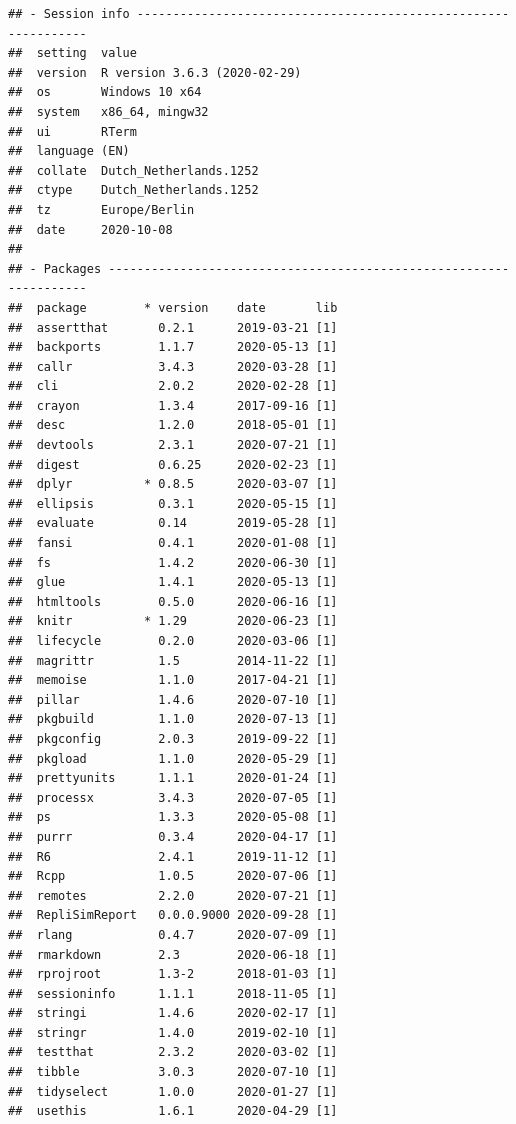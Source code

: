 \documentclass[10,a4paperpaper,]{article}
\begin{document}
\begin{verbatim}
## - Session info ---------------------------------------------------------------
##  setting  value                       
##  version  R version 3.6.3 (2020-02-29)
##  os       Windows 10 x64              
##  system   x86_64, mingw32             
##  ui       RTerm                       
##  language (EN)                        
##  collate  Dutch_Netherlands.1252      
##  ctype    Dutch_Netherlands.1252      
##  tz       Europe/Berlin               
##  date     2020-10-08                  
## 
## - Packages -------------------------------------------------------------------
##  package        * version    date       lib
##  assertthat       0.2.1      2019-03-21 [1]
##  backports        1.1.7      2020-05-13 [1]
##  callr            3.4.3      2020-03-28 [1]
##  cli              2.0.2      2020-02-28 [1]
##  crayon           1.3.4      2017-09-16 [1]
##  desc             1.2.0      2018-05-01 [1]
##  devtools         2.3.1      2020-07-21 [1]
##  digest           0.6.25     2020-02-23 [1]
##  dplyr          * 0.8.5      2020-03-07 [1]
##  ellipsis         0.3.1      2020-05-15 [1]
##  evaluate         0.14       2019-05-28 [1]
##  fansi            0.4.1      2020-01-08 [1]
##  fs               1.4.2      2020-06-30 [1]
##  glue             1.4.1      2020-05-13 [1]
##  htmltools        0.5.0      2020-06-16 [1]
##  knitr          * 1.29       2020-06-23 [1]
##  lifecycle        0.2.0      2020-03-06 [1]
##  magrittr         1.5        2014-11-22 [1]
##  memoise          1.1.0      2017-04-21 [1]
##  pillar           1.4.6      2020-07-10 [1]
##  pkgbuild         1.1.0      2020-07-13 [1]
##  pkgconfig        2.0.3      2019-09-22 [1]
##  pkgload          1.1.0      2020-05-29 [1]
##  prettyunits      1.1.1      2020-01-24 [1]
##  processx         3.4.3      2020-07-05 [1]
##  ps               1.3.3      2020-05-08 [1]
##  purrr            0.3.4      2020-04-17 [1]
##  R6               2.4.1      2019-11-12 [1]
##  Rcpp             1.0.5      2020-07-06 [1]
##  remotes          2.2.0      2020-07-21 [1]
##  RepliSimReport   0.0.0.9000 2020-09-28 [1]
##  rlang            0.4.7      2020-07-09 [1]
##  rmarkdown        2.3        2020-06-18 [1]
##  rprojroot        1.3-2      2018-01-03 [1]
##  sessioninfo      1.1.1      2018-11-05 [1]
##  stringi          1.4.6      2020-02-17 [1]
##  stringr          1.4.0      2019-02-10 [1]
##  testthat         2.3.2      2020-03-02 [1]
##  tibble           3.0.3      2020-07-10 [1]
##  tidyselect       1.0.0      2020-01-27 [1]
##  usethis          1.6.1      2020-04-29 [1]

\end{verbatim}
\end{document}
